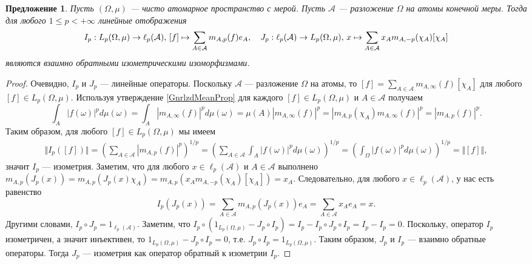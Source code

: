\documentclass[12pt]{article}
\newtheorem{proposition}[theorem]{Предложение}
\begin{document}
\begin{proposition}\label{LpOnPurAtomMeasSpRepr}
    Пусть $(\Omega,\mu)$ --- чисто атомарное пространство с мерой. 
    Пусть $\mathcal{A}$ --- разложение $\Omega$ на атомы конечной меры. Тогда 
    для любого $1\leq p<+\infty$ линейные отображения
    \[
        I_p:
        L_p(\Omega,\mu)\to \ell_p(\mathcal{A}),\,
        [f]\mapsto\sum_{A\in\mathcal{A}} m_{A,p}(f) e_A,
        \quad
        J_p:
        \ell_p(\mathcal{A})\to L_p(\Omega,\mu),\,
        x\mapsto\sum_{A\in\mathcal{A}} x_A m_{A,-p}(\chi_A) [\chi_A]\\
    \]
    являются взаимно обратными изометрическими изоморфизмами.
\end{proposition}
\begin{proof} 
    Очевидно, $I_p$ и $J_p$ --- линейные операторы. Поскольку $\mathcal{A}$ --- 
    разложение $\Omega$ на атомы, то
    $
        [f]=\sum_{A\in\mathcal{A}} m_{A,\infty}(f)[\chi_A]
    $
    для любого $[f]\in L_p(\Omega,\mu)$. Используя 
    утверждение \ref{GnrlzdMeanProp} для 
    каждого $[f]\in L_p(\Omega,\mu)$ и $A\in\mathcal{A}$ получаем
    \[
        \int_A |f(\omega)|^pd\mu(\omega)
        =\int_A\left|m_{A,\infty}(f)\right|^pd\mu(\omega)
        =\mu(A)\left|m_{A,\infty}(f)\right|^p
        =\left|m_{A,p}(\chi_A) m_{A,\infty}(f)\right|^p
        =|m_{A,p}(f)|^p.
    \]
    Таким образом, для любого $[f]\in L_p(\Omega,\mu)$ мы имеем
    \[
    \begin{aligned}
        \Vert I_p([f])\Vert
        =\left( \sum_{A\in\mathcal{A}} |m_{A,p}(f)|^p\right)^{1/p} 
        =\left( 
            \sum_{A\in\mathcal{A}} \int_A |f(\omega)|^pd\mu(\omega)
        \right)^{1/p} 
        =\left( \int_{\Omega} |f(\omega)|^pd\mu(\omega)\right)^{1/p} 
        =\Vert [f]\Vert,
    \end{aligned}
    \]
    значит $I_p$ --- изометрия. Заметим, что для 
    любого $x\in\ell_p(\mathcal{A})$ и $A\in\mathcal{A}$ выполнено
    $
        m_{A,p}(J_p(x))
        =m_{A,p}(J_p(x)\chi_A)
        =m_{A,p}(x_A m_{A,-p}(\chi_A)[\chi_A])
        =x_A.
    $
    Следовательно, для любого $x\in\ell_p(\mathcal{A})$, у нас есть равенство
    \[
        I_p(J_p(x))
        =\sum_{A\in\mathcal{A}}m_{A,p}(J_p(x))e_A
        =\sum_{A\in\mathcal{A}}x_A e_A
        =x.
    \]
    Другими словами, $I_p\circ J_p=1_{\ell_p(\mathcal{A})}$. 
    Заметим, что
    $
        I_p\circ(1_{L_p(\Omega,\mu)}-J_p\circ I_p)
        =I_p-I_p\circ J_p\circ I_p
        =I_p-I_p
        =0
    $. 
    Поскольку, оператор $I_p$ изометричен, а значит инъективен, 
    то $1_{L_p(\Omega,\mu)}-J_p\circ I_p=0$, 
    т.е. $J_p\circ I_p=1_{L_p(\Omega,\mu)}$. Таким образом, $J_p$ и $I_p$ ---
    взаимно обратные операторы. Тогда $J_p$ --- изометрия как оператор обратный
    к изометрии $I_p$.
\end{proof}
\end{document}
